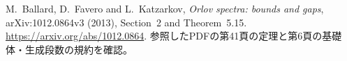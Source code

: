 M.~Ballard, D.~Favero and L.~Katzarkov,
\emph{Orlov spectra: bounds and gaps},
arXiv:1012.0864v3 (2013), Section~2 and Theorem~5.15.
\url{https://arxiv.org/abs/1012.0864}.
参照したPDFの第41頁の定理と第6頁の基礎体・生成段数の規約を確認。
